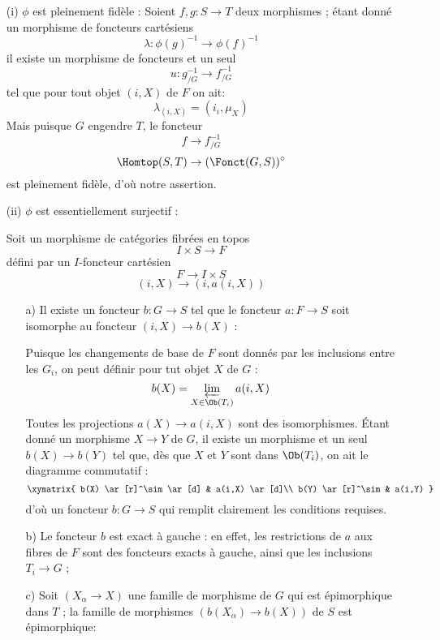 \begin{enumerate}
    \item[(i)] $\phi$ est pleinement fidèle : 
    Soient $f, g: S \to T$ deux morphismes ; étant donné un morphisme de foncteurs cartésiens
    $$
    \lambda: \phi(g)^{-1} \to \phi(f)^{-1}
    $$
    il existe un morphisme de foncteurs et un seul
    $$
    u: g^{-1}_{/G} \to f^{-1}_{/G}
    $$
    tel que pour tout objet $(i, X)$ de $F$ on ait: 
    $$
    \lambda_{(i, X)} = (i_i, \mu_X)
    $$
    Mais puisque $G$ engendre $T$, le foncteur
    $$
    f \to f^{-1}_{/G}
    $$
    $$
    \Homtop(S, T) \to (\Fonct(G, S))^\circ
    $$
    est pleinement fidèle, d'où notre assertion.
    \item[(ii)] $\phi$ est essentiellement surjectif : 
    
    Soit un morphisme de catégories fibrées en topos
    $$
    I \times S \to F
    $$
    défini par un $I$-foncteur cartésien
    $$
    F \to I \times S
    $$
    $$
    (i, X) \to (i, a(i, X))
    $$
    \begin{enumerate}
        \item[a)] Il existe un foncteur $b: G \to S$ tel que le foncteur $a: F \to S$ soit isomorphe au foncteur $(i, X) \to b(X)$ :
        
        Puisque les changements de base de $F$ sont donnés par les inclusions entre les $G_i$, on peut définir pour tut objet $X$ de $G$ :
        $$
        b(X) = \varprojlim_{X \in \Ob(T_i)} a(i, X)
        $$
    Toutes les projections $a(X) \to a(i, X)$ sont des isomorphismes. Étant donné un morphisme $X \to Y$ de $G$, il existe un morphisme et un seul $b(X) \to b(Y)$ tel que, dès que $X$ et $Y$ sont dans $\Ob(T_i)$, on ait le diagramme commutatif :
    $$
        \xymatrix{
            b(X) \ar[r]^\sim \ar[d] & a(i,X) \ar[d]\\
            b(Y) \ar[r]^\sim & a(i,Y)
        }
    $$
     d'où un foncteur $b: G\to S$ qui remplit clairement les conditions requises.
     \item[b)] Le foncteur $b$ est exact à gauche : en effet, les restrictions de $a$ aux fibres de $F$ sont des foncteurs exacts à gauche, ainsi que les inclusions $T_i \to G$ ;
     \item[c)] Soit $(X_\alpha \to X)$ une famille de morphisme de $G$ qui est épimorphique dans $T$ ; la famille de morphismes $(b(X_\alpha) \to b(X))$ de $S$ est épimorphique:
     

\end{enumerate}
\end{enumerate}

